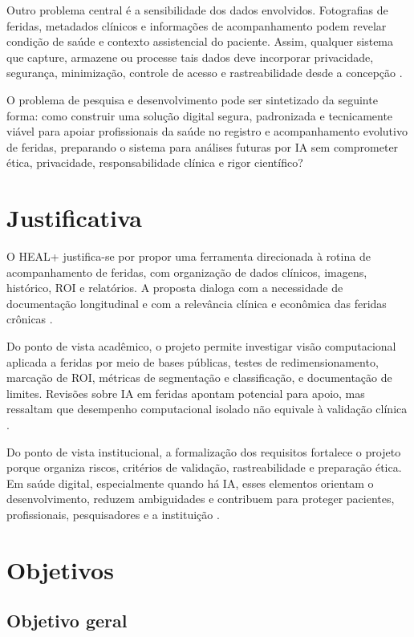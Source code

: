 \documentclass[
    12pt,
    oneside,
    a4paper,
    chapter=TITLE,
    brazil,
    sumario=tradicional,
    hidelinks
]{abntex2}
\begin{document}
Outro problema central é a sensibilidade dos dados envolvidos. Fotografias de feridas, metadados clínicos e informações de acompanhamento podem revelar condição de saúde e contexto assistencial do paciente. Assim, qualquer sistema que capture, armazene ou processe tais dados deve incorporar privacidade, segurança, minimização, controle de acesso e rastreabilidade desde a concepção \cite{brasil2018,anpd2023}.

O problema de pesquisa e desenvolvimento pode ser sintetizado da seguinte forma: como construir uma solução digital segura, padronizada e tecnicamente viável para apoiar profissionais da saúde no registro e acompanhamento evolutivo de feridas, preparando o sistema para análises futuras por IA sem comprometer ética, privacidade, responsabilidade clínica e rigor científico?

\chapter{Justificativa}

O HEAL+ justifica-se por propor uma ferramenta direcionada à rotina de acompanhamento de feridas, com organização de dados clínicos, imagens, histórico, ROI e relatórios. A proposta dialoga com a necessidade de documentação longitudinal e com a relevância clínica e econômica das feridas crônicas \cite{olsson2019,sen2019,batesjensen2019}.

Do ponto de vista acadêmico, o projeto permite investigar visão computacional aplicada a feridas por meio de bases públicas, testes de redimensionamento, marcação de ROI, métricas de segmentação e classificação, e documentação de limites. Revisões sobre IA em feridas apontam potencial para apoio, mas ressaltam que desempenho computacional isolado não equivale à validação clínica \cite{anisuzzaman2022,dabas2023}.

Do ponto de vista institucional, a formalização dos requisitos fortalece o projeto porque organiza riscos, critérios de validação, rastreabilidade e preparação ética. Em saúde digital, especialmente quando há IA, esses elementos orientam o desenvolvimento, reduzem ambiguidades e contribuem para proteger pacientes, profissionais, pesquisadores e a instituição \cite{who2021,who2023}.

\chapter{Objetivos}

\section{Objetivo geral}
\end{document}
